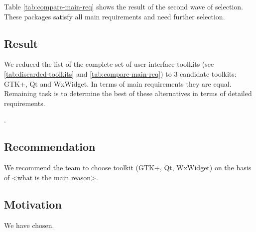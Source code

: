 Table \ref{tab:compare-main-req} shows the result of the second wave of
selection. These packages satisfy all main requirements and need further
selection. 

\subsection{Result}

We reduced the list of the complete set of user interface toolkits (see
\ref{tab:discarded-toolkits} and \ref{tab:compare-main-req}) to 3
candidate toolkits: GTK+, Qt and WxWidget. In terms of main requirements they
are equal. Remaining task is to determine the best of these alternatives in
terms of detailed requirements. 

.

\subsection{Recommendation}

We recommend the team to choose toolkit (GTK+, Qt, WxWidget) on the basis
of <what is the main reason>.

\subsection{Motivation}

We have chosen.
